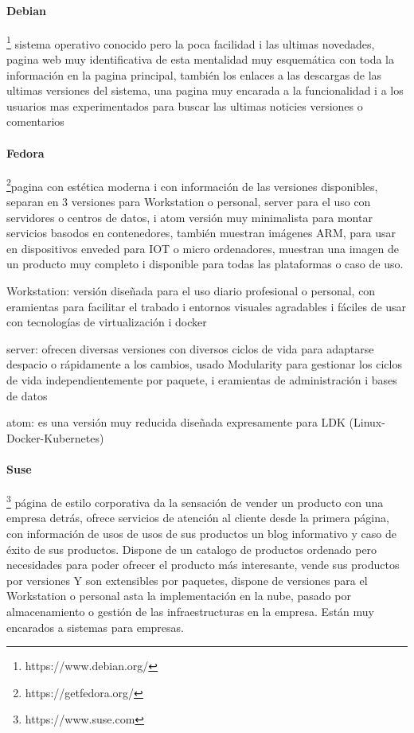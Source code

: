 \documentclass[preprint,11pt]{elsarticle}
\begin{document}
\paragraph{Debian}\footnote{https://www.debian.org/} sistema operativo conocido pero la poca facilidad i las ultimas novedades, pagina web muy identificativa de esta mentalidad muy esquemática con toda la información en la pagina principal, también los enlaces a las descargas de las ultimas versiones del sistema, una pagina muy encarada a la funcionalidad i a los usuarios mas experimentados para buscar las ultimas noticies versiones o comentarios 

\paragraph{Fedora}\footnote{https://getfedora.org/}pagina con estética moderna i con información de las versiones disponibles, separan en 3 versiones para Workstation o personal, server para el uso con servidores o centros de datos, i atom versión muy minimalista para montar servicios basodos en contenedores, también muestran imágenes ARM, para usar en dispositivos enveded para IOT o micro ordenadores, muestran una imagen de un producto muy completo i disponible para todas las plataformas o caso de uso.\bigskip

Workstation: versión diseñada para el uso diario profesional o personal, con eramientas para facilitar el trabado i entornos visuales agradables i fáciles de usar con tecnologías de virtualización i docker\bigskip

server: ofrecen diversas versiones con diversos ciclos de vida para adaptarse despacio o rápidamente a los cambios, usado Modularity para gestionar los ciclos de vida independientemente por paquete, i eramientas de administración i bases de datos\bigskip

atom: es una versión muy reducida diseñada expresamente para  LDK (Linux-Docker-Kubernetes)\bigskip

\paragraph{Suse}\footnote{https://www.suse.com} página de estilo corporativa da la sensación de vender un producto con una empresa detrás, ofrece servicios de atención al cliente desde la primera página, con información de usos de usos de sus productos un blog informativo y caso de éxito de sus productos. Dispone de un catalogo de productos ordenado pero necesidades para poder ofrecer el producto más interesante, vende sus productos por versiones Y son extensibles por paquetes, dispone de versiones para el Workstation o personal asta la implementación en la nube, pasado por almacenamiento o gestión de las infraestructuras en la empresa. Están muy encarados a sistemas para empresas. \bigskip
\end{document}
